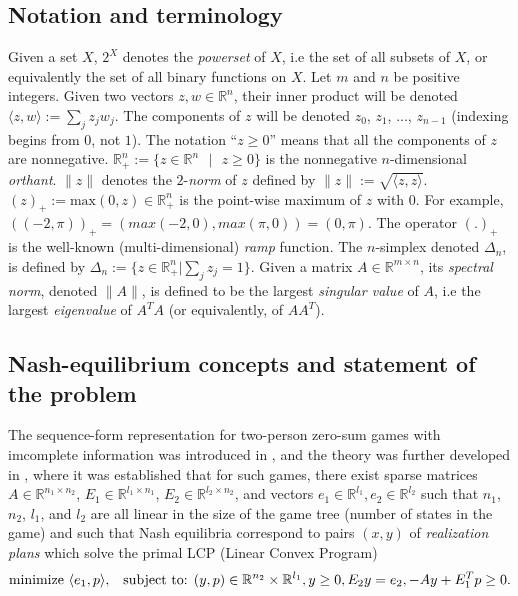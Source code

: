 \documentclass{article} %
\begin{document}
\subsection{Notation and terminology}
Given a set $X$, $2^X$ denotes the \emph{powerset} of $X$, i.e the set
of all subsets of $X$, or equivalently the set of all binary
functions on $X$. Let $m$ and $n$ be positive integers. Given two
vectors $z, w \in \mathbb{R}^n$, their inner product will be denoted
$\langle z, w\rangle := \sum_{j}z_jw_j$. The components of $z$ will be
denoted $z_0$, $z_1$, ..., $z_{n-1}$ (indexing begins from $0$,
not $1$). The notation ``$z \ge 0$'' means that all the components of
$z$ are nonnegative.
$\mathbb{R}^{n}_+ := \{z \in \mathbb{R}^{n}\text{ }|\text{ } z \geq
0\}$ is the nonnegative $n$-dimensional \textit{orthant}.  $\|z\|$ denotes the
$2$-\textit{norm} of $z$ defined by $\|z\| := \sqrt{\langle z,
  z\rangle}$. $(z)_+:=\text{max}(0, z) \in \mathbb{R}^{n}_+$ is the
point-wise maximum of $z$ with $0$. For example, $((-2, \pi))_+ =
(max(-2, 0), max(\pi, 0)) = (0, \pi)$. The operator $(.)_+$ is the
well-known (multi-dimensional) \textit{ramp} function. The
$n$-simplex denoted $\Delta_n$, is defined by $\Delta_n := \{z \in
\mathbb{R}^n_+|\sum_j z_j = 1\}$.
Given a matrix $A \in \mathbb{R}^{m \times n}$, its \textit{spectral
  norm}, denoted $\|A\|$, is
 defined to be the largest \textit{singular value} of $A$, i.e the
 largest \textit{eigenvalue} of $A^TA$ (or equivalently, of $AA^T$).

\subsection{Nash-equilibrium concepts and statement of the problem}
The sequence-form representation for two-person zero-sum games with
imcomplete information was introduced in
\cite{koller1992complexity}, and the theory was further developed in
\cite{koller1994fast,von1996efficient,vonequilibrium}, where it was
established that for such games, there exist sparse matrices
$A \in \mathbb{R}^{n_1 \times n_2}$, $E_1 \in \mathbb{R}^{l_1 \times
  n_1}$, $E_2 \in \mathbb{R}^{l_2 \times n_2}$, and vectors $e_1 \in
\mathbb{R}^{l_1}, e_2 \in \mathbb{R}^{l_2}$ such that $n_1$, $n_2$,
$l_1$, and $l_2$ are all linear in the size of the game tree (number
of states in the game) and such that Nash equilibria correspond to
pairs $(x, y)$ of \textit{realization plans} which solve the primal
LCP (Linear Convex Program)
\begin{equation}
  \begin{aligned}
     \text{minimize }\langle e_1, p\rangle, \hspace{.5em}\text{
       subject to: }(y,p) \in \mathbb{R}^{n_2} \times
     \mathbb{R}^{l_1},  y \ge 0, E_2y = e_2, -Ay + E_1^Tp \geq 0.
  \end{aligned}
  \label{eq:primal_pb}
\end{equation}
\end{document}
